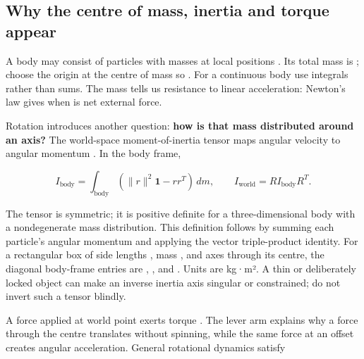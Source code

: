 \subsection{Why the centre of mass, inertia and torque appear}\label{02-foundations-ii-ch039-why-the-centre-of-mass-inertia-and-torque-appear}

\hypertarget{02-foundations-ii-ch039-why-the-centre-of-mass-inertia-and-torque-appear}{}

A body may consist of particles with masses  at local positions . Its total mass is ; choose the origin at the centre of mass so . For a continuous body use integrals rather than sums. The mass tells us resistance to linear acceleration: Newton's law gives  when  is net external force.

Rotation introduces another question: \textbf{how is that mass distributed around an axis?} The world-space moment-of-inertia tensor  maps angular velocity to angular momentum . In the body frame,

\[
I_{\mathrm{body}}=\int_{\mathrm{body}}(\|r\|^2\mathbf{1}-rr^T)\,dm,
\qquad I_{\mathrm{world}}=R I_{\mathrm{body}}R^T.
\]

The tensor is symmetric; it is positive definite for a three-dimensional body with a nondegenerate mass distribution. This definition follows by summing each particle's angular momentum  and applying the vector triple-product identity. For a rectangular box of side lengths , mass , and axes through its centre, the diagonal body-frame entries are , , and . Units are kg·m². A thin or deliberately locked object can make an inverse inertia axis singular or constrained; do not invert such a tensor blindly.

A force  applied at world point  exerts torque . The lever arm explains why a force through the centre translates without spinning, while the same force at an offset creates angular acceleration. General rotational dynamics satisfy

